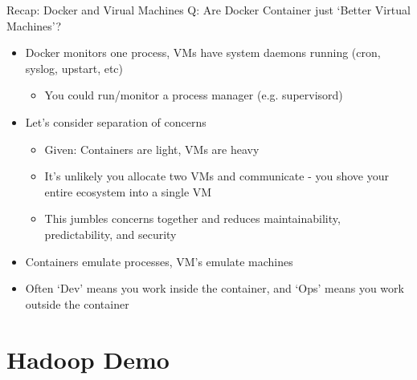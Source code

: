 \documentclass[xcolor=dvipsnames]{beamer}
\begin{document}
\begin{frame}{Recap: Docker and Virual Machines}
  Q: Are Docker Container just `Better Virtual Machines'?

  \begin{itemize}
  \item Docker monitors one process, VMs have system daemons running (cron, syslog, upstart, etc)
    \begin{itemize}
    \item You could run/monitor a process manager (e.g. supervisord)
    \end{itemize}
  \item Let's consider separation of concerns
    \begin{itemize}
    \item Given: Containers are light, VMs are heavy
    \item It's unlikely you allocate two VMs and communicate - you shove your entire ecosystem into a single VM
    \item This jumbles concerns together and reduces maintainability, predictability, and security
    \end{itemize}
  \item Containers emulate processes, VM's emulate machines 
  \item Often `Dev' means you work inside the container, and `Ops' means you work outside the container
  \end{itemize}
\end{frame}

\section{Hadoop Demo}
\end{document}
